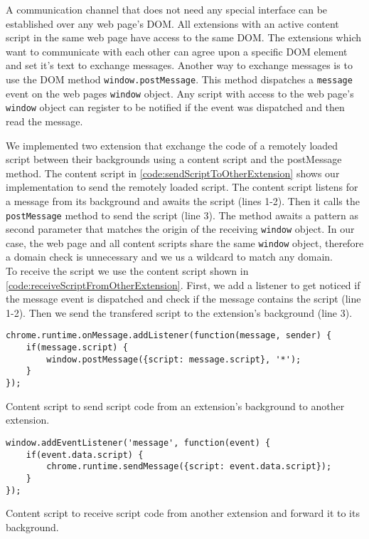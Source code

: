 	A communication channel that does not need any special interface can be established over any web page's DOM. All extensions with an active content script in the same web page have access to the same DOM. The extensions which want to communicate with each other can agree upon a specific DOM element and set it's text to exchange messages. Another way to exchange messages is to use the DOM method \texttt{window.postMessage}. This method dispatches a \texttt{message} event on the web pages \texttt{window} object. Any script with access to the web page's \texttt{window} object can register to be notified if the event was dispatched and then read the message. 
	
	We implemented two extension that exchange the code of a remotely loaded script between their backgrounds using a content script and the postMessage method. The content script in \autoref{code:sendScriptToOtherExtension} shows our implementation to send the remotely loaded script. The content script listens for a message from its background and awaits the script (lines 1-2). Then it calls the \texttt{postMessage} method to send the script (line 3). The method awaits a pattern as second parameter that matches the origin of the receiving \texttt{window} object. In our case, the web page and all content scripts share the same \texttt{window} object, therefore a domain check is unnecessary and we us a wildcard to match any domain. \\
	To receive the script we use the content script shown in \autoref{code:receiveScriptFromOtherExtension}. First, we add a listener to get noticed if the message event is dispatched and check if the message contains the script (line 1-2). Then we send the transfered script to the extension's background (line 3). 
	
	\begin{code}
		\begin{lstlisting}
chrome.runtime.onMessage.addListener(function(message, sender) {
	if(message.script) {
		window.postMessage({script: message.script}, '*');
	}
});
\end{lstlisting}
		\caption{Content script to send script code from an extension's background to another extension.}
		\label{code:sendScriptToOtherExtension}
	\end{code}
	
	\begin{code}
		\begin{lstlisting}
window.addEventListener('message', function(event) {
	if(event.data.script) {
		chrome.runtime.sendMessage({script: event.data.script});
	}
});
\end{lstlisting}
		\caption{Content script to receive script code from another extension and forward it to its background.}
		\label{code:receiveScriptFromOtherExtension}
	\end{code}

